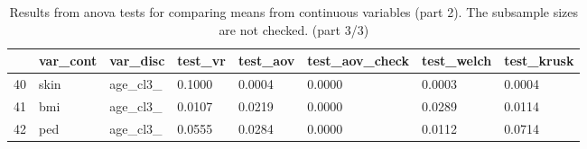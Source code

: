 \documentclass[12pt]{article}
\begin{document}
\begin{landscape}
\newpage
\begin{table}[ht]
\centering
\begin{tabular}{rlllllll}
  \hline
 & var\_cont & var\_disc & test\_vr & test\_aov & test\_aov\_check & test\_welch & test\_krusk \\ 
  \hline
40 & skin & age\_cl3\_ & 0.1000 & 0.0004 & 0.0000 & 0.0003 & 0.0004 \\ 
  41 & bmi & age\_cl3\_ & 0.0107 & 0.0219 & 0.0000 & 0.0289 & 0.0114 \\ 
  42 & ped & age\_cl3\_ & 0.0555 & 0.0284 & 0.0000 & 0.0112 & 0.0714 \\ 
   \hline
\end{tabular}
\caption{Results from anova tests for comparing means from continuous variables (part 2). The subsample sizes are not checked. (part 3/3)} 
\label{tab:anova.test2.3}
\end{table}
 
\newpage
\end{landscape}
\pagestyle{plain}
\end{document}
